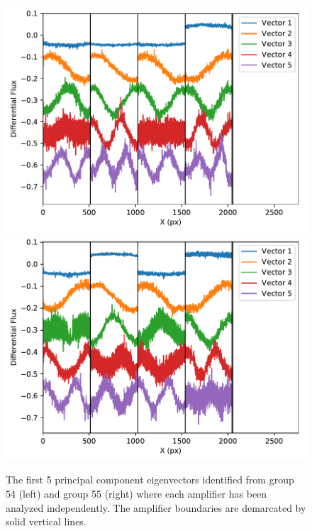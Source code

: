 \documentclass[]{aastex62}
\begin{document}
\begin{figure}[!hbtp]
\centering
\includegraphics[width=.4\columnwidth]{pca_dark_ind_amp_grp_54_extra_bias_sub.pdf}
\includegraphics[width=.4\columnwidth]{pca_dark_ind_amp_grp_55_extra_bias_sub.pdf}
\caption{The first 5 principal component eigenvectors identified from group 54 (left) and group 55 (right) where each amplifier has been analyzed independently.
The amplifier boundaries are demarcated by solid vertical lines.
}\label{fig:pcaEigenvectorsIndAmp}
\end{figure}
\end{document}
